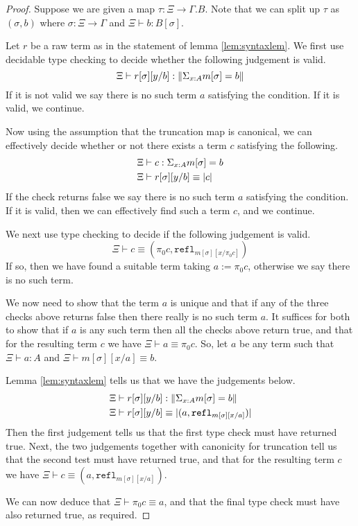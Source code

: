 \documentclass[a4paper]{amsart}
\theoremstyle{definition}
\newcommand{\refl}{\mathtt{refl}}
\begin{document}
\begin{proof}
  Suppose we are given a map $\tau \colon \Xi \to \Gamma.B$. Note that
  we can split up $\tau$ as $(\sigma, b)$ where
  $\sigma \colon \Xi \to \Gamma$ and $\Xi \vdash b : B[\sigma]$.

  
  Let $r$ be a raw term as in the statement of lemma
  \ref{lem:syntaxlem}. We first use decidable type checking to decide
  whether the following judgement is valid.
  \begin{equation*}
    \Xi \vdash r[\sigma][y/b] : \| \Sigma_{x : A} m[\sigma] = b \|
  \end{equation*}
  If it is not valid we say there is no such term $a$ satisfying the
  condition. If it is valid, we continue.
  
  Now using the assumption that the truncation map is canonical, we
  can effectively decide whether or not there exists a term $c$
  satisfying the following.
  \begin{align*}
    \Xi &\vdash c : \Sigma_{x : A} m[\sigma] = b \\
    \Xi &\vdash r[\sigma][y/b] \equiv |c|
  \end{align*}
  If the check returns false we say there is no such term $a$
  satisfying the condition. If it is valid, then we can effectively
  find such a term $c$, and we continue.

  We next use type checking to decide if the following judgement is
  valid.
  \begin{equation*}
    \Xi \vdash c \equiv (\pi_0 c, \refl_{m[\sigma][x/\pi_0 c]})
  \end{equation*}
  If so, then we have found a suitable term taking $a := \pi_0 c$,
  otherwise we say there is no such term.

  We now need to show that the term $a$ is unique and that if any of
  the three checks above returns false then there really is no such
  term $a$. It suffices for both to show that if $a$ is any such term
  then all the checks above return true, and that for the resulting
  term $c$ we have $\Xi \vdash a \equiv \pi_0 c$. So, let $a$ be
  any term such that $\Xi \vdash a : A$ and
  $\Xi \vdash m[\sigma][x/a] \equiv b$.

  Lemma \ref{lem:syntaxlem} tells us that we have the judgements
  below.
  \begin{align*}
    \Xi &\vdash r[\sigma][y/b] : \| \fibre{m[\sigma]}{b} \|  \\
    \Xi &\vdash r[\sigma][y/b] \equiv | (a, \refl_{m[\sigma][x/a]})
         |
  \end{align*}
  Then the first judgement tells us that the first type check must
  have returned true. Next, the two judgements together with
  canonicity for truncation tell us that the second test must have
  returned true, and that for the resulting term $c$ we have
  $\Xi \vdash c \equiv (a, \refl_{m[\sigma][x/a]})$.

  We can now deduce that $\Xi \vdash \pi_0 c \equiv a$, and that
  the final type check must have also returned true, as required.
\end{proof}
\end{document}
